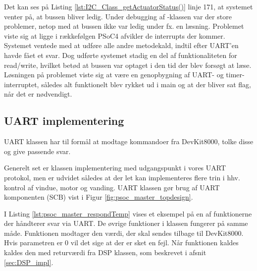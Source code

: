 \clearpage



Det kan ses på Listing \ref{lst:I2C_Class_getActuatorStatus()} linje 171, at systemet venter på, at bussen bliver ledig. Under debugging af \IIC-klassen var der store problemer, netop med at bussen ikke var ledig under fx. en læsning. 
Problemet viste sig at ligge i rækkefølgen PSoC4 afvikler de interrupts der kommer. 
Systemet ventede med at udføre alle andre metodekald, indtil efter UART'en havde fået et svar. 
Dog udførte systemet stadig en del af funktionaliteten for \IIC read/write, hvilket betød at bussen var optaget i den tid der blev forsøgt at læse. 
Løsningen på problemet viste sig at være en genopbygning af UART- og timer-interruptet, således alt funktionelt blev rykket ud i main og at der bliver sat flag, når det er nødvendigt.

\subsection{UART implementering}
UART klassen har til formål at modtage kommandoer fra DevKit8000, tolke disse og give passende svar. 

Generelt set er klassen implementering med udgangspunkt i vores UART protokol, men er udvidet således at der let kan implementeres flere trin i hhv. kontrol af vindue, motor og vanding. UART klassen gør brug af UART komponenten (SCB) vist i Figur \ref{fig:psoc_master_topdesign}.



I Listing \ref{lst:psoc_master_respondTemp} vises et eksempel på en af funktionerne der håndterer svar via UART. De øvrige funktioner i klassen fungerer på samme måde. Funktionen modtager den værdi, der skal sendes tilbage til DevKit8000. Hvis parametren er 0 vil det sige at der er sket en fejl. Når funktionen kaldes kaldes den med returværdi fra DSP klassen, som beskrevet i afsnit \ref{sec:DSP_impl}.



